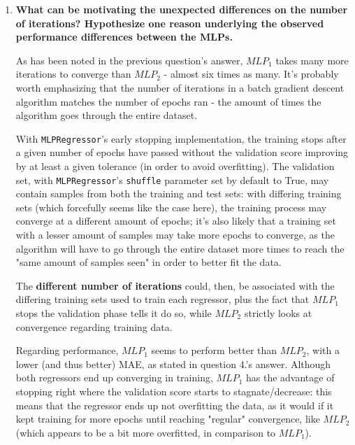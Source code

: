 \documentclass[12pt]{article}
\begin{document}
\begin{enumerate}[leftmargin=\labelsep,resume]
  \item \textbf{What can be motivating the unexpected differences on the number of iterations?
          Hypothesize one reason underlying the observed performance differences between the MLPs.}

        As has been noted in the previous question's answer, $MLP_1$ takes many more
        iterations to converge than $MLP_2$ - almost six times as many. It's probably
        worth emphasizing that the number of iterations in a batch gradient descent
        algorithm matches the number of epochs ran - the amount of times the algorithm goes
        through the entire dataset.

        With \texttt{MLPRegressor}'s early stopping implementation, the training stops
        after a given number of epochs have passed without the validation score
        improving by at least a given tolerance (in order to avoid overfitting).
        The validation set, with \texttt{MLPRegressor}'s \texttt{shuffle} parameter
        set by default to True, may contain samples from both the training and test sets:
        with differing training sets (which forcefully seems like the case here),
        the training process may converge at a different amount of epochs; it's
        also likely that a training set with a lesser amount of samples may
        take more epochs to converge, as the algorithm will have to go through
        the entire dataset more times to reach the "same amount of samples seen"
        in order to better fit the data.

        The \textbf{different number of iterations} could, then, be associated
        with the differing training sets used to train each regressor, plus the
        fact that $MLP_1$ stops the validation phase tells it do so, while $MLP_2$
        strictly looks at convergence regarding training data.

        Regarding performance, $MLP_1$ seems to perform better than $MLP_2$,
        with a lower (and thus better) MAE, as stated in question 4.'s answer.
        Although both regressors end up converging in training, $MLP_1$ has
        the advantage of stopping right where the validation score starts to
        stagnate/decrease: this means that the regressor ends up not overfitting
        the data, as it would if it kept training for more epochs until reaching
        "regular" convergence, like $MLP_2$ (which appears to be a bit more overfitted,
        in comparison to $MLP_1$).


\end{enumerate}
\end{document}
